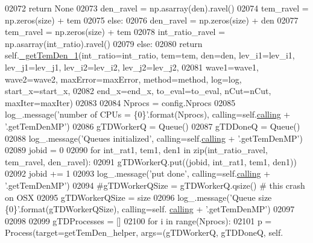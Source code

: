 \begin{DoxyCode}
02072                     \textcolor{keywordflow}{return} \textcolor{keywordtype}{None}
02073                 den\_ravel = np.asarray(den).ravel()
02074                 tem\_ravel = np.zeros(size) + tem
02075             \textcolor{keywordflow}{else}:
02076                 den\_ravel = np.zeros(size) + den
02077                 tem\_ravel = np.zeros(size) + tem
02078             int\_ratio\_ravel = np.asarray(int\_ratio).ravel()
02079         \textcolor{keywordflow}{else}:
02080             \textcolor{keywordflow}{return} self.\hyperlink{classpyneb_1_1core_1_1pynebcore_1_1_atom_ad1d75f64b27a6acee079b5738b69dabe}{\_getTemDen\_1}(int\_ratio=int\_ratio, tem=tem, den=den, lev\_i1=lev\_i1, 
      lev\_j1=lev\_j1, lev\_i2=lev\_i2, lev\_j2=lev\_j2,
02081                   wave1=wave1, wave2=wave2, maxError=maxError, method=method, log=log, start\_x=start\_x,
02082                   end\_x=end\_x, to\_eval=to\_eval, nCut=nCut, maxIter=maxIter)
02083         
02084         Nprocs = config.Nprocs
02085         log\_.message(\textcolor{stringliteral}{'number of CPUs = \{0\}'}.format(Nprocs), calling=self.\hyperlink{classpyneb_1_1core_1_1pynebcore_1_1_atom_a373b7735acf4f528b54bddf373ad67a1}{calling} + \textcolor{stringliteral}{'.getTemDenMP'})
02086         gTDWorkerQ = Queue()
02087         gTDDoneQ = Queue()
02088         log\_.message(\textcolor{stringliteral}{'Queues initialized'}, calling=self.\hyperlink{classpyneb_1_1core_1_1pynebcore_1_1_atom_a373b7735acf4f528b54bddf373ad67a1}{calling} + \textcolor{stringliteral}{'.getTemDenMP'})
02089         jobid = 0
02090         \textcolor{keywordflow}{for} int\_rat1, tem1, den1 \textcolor{keywordflow}{in} zip(int\_ratio\_ravel, tem\_ravel, den\_ravel):
02091             gTDWorkerQ.put((jobid, int\_rat1, tem1, den1))
02092             jobid += 1
02093         log\_.message(\textcolor{stringliteral}{'put done'}, calling=self.\hyperlink{classpyneb_1_1core_1_1pynebcore_1_1_atom_a373b7735acf4f528b54bddf373ad67a1}{calling} + \textcolor{stringliteral}{'.getTemDenMP'})
02094         \textcolor{comment}{#gTDWorkerQSize = gTDWorkerQ.qsize() # this crash on OSX}
02095         gTDWorkerQSize = size
02096         log\_.message(\textcolor{stringliteral}{'Queue size \{0\}'}.format(gTDWorkerQSize), calling=self.
      \hyperlink{classpyneb_1_1core_1_1pynebcore_1_1_atom_a373b7735acf4f528b54bddf373ad67a1}{calling} + \textcolor{stringliteral}{'.getTemDenMP'})
02097 
02098         
02099         gTDProcesses = []
02100         \textcolor{keywordflow}{for} i \textcolor{keywordflow}{in} range(Nprocs):
02101             p = Process(target=getTemDen\_helper, args=(gTDWorkerQ, gTDDoneQ, self.

\end{DoxyCode}
